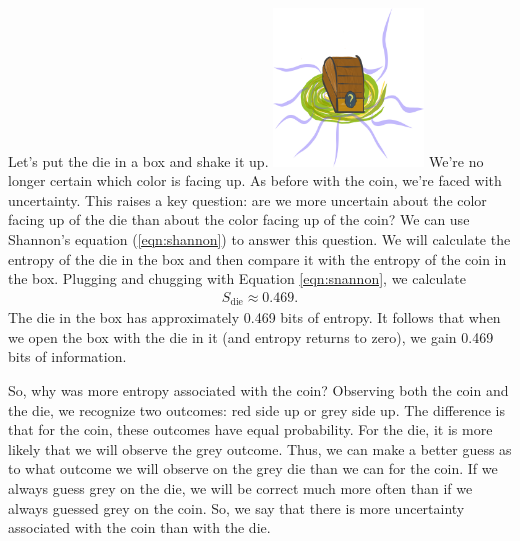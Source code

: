 Let's put the die in a box and shake it up.
\includegraphics[width=0.3\textwidth]{img/small-box-closed-portal}
We're no longer certain which color is facing up.
As before with the coin, we're faced with uncertainty.
This raises a key question: are we more uncertain about the color facing up of the die than about the color facing up of the coin?
We can use Shannon's equation (\ref{eqn:shannon}) to answer this question.
We will calculate the entropy of the die in the box and then compare it with the entropy of the coin in the box.
Plugging and chugging with Equation \ref{eqn:snannon}, we calculate
\begin{align*}
S_{\text{die}} \approx 0.469.
\end{align*}
The die in the box has approximately 0.469 bits of entropy.
It follows that when we open the box with the die in it (and entropy returns to zero), we gain 0.469 bits of information.

So, why was more entropy associated with the coin?
Observing both the coin and the die, we recognize two outcomes: red side up or grey side up.
The difference is that for the coin, these outcomes have equal probability.
For the die, it is more likely that we will observe the grey outcome.
Thus, we can make a better guess as to what outcome we will observe on the grey die than we can for the coin.
If we always guess grey on the die, we will be correct much more often than if we always guessed grey on the coin.
So, we say that there is more uncertainty associated with the coin than with the die.
